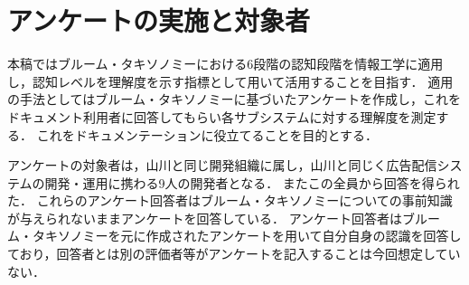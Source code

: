 \section{アンケートの実施と対象者}
本稿ではブルーム・タキソノミーにおける6段階の認知段階を情報工学に適用し，認知レベルを理解度を示す指標として用いて活用することを目指す．
適用の手法としてはブルーム・タキソノミーに基づいたアンケートを作成し，これをドキュメント利用者に回答してもらい各サブシステムに対する理解度を測定する．
これをドキュメンテーションに役立てることを目的とする．

アンケートの対象者は，山川と同じ開発組織に属し，山川と同じく広告配信システムの開発・運用に携わる9人の開発者となる．
またこの全員から回答を得られた．
これらのアンケート回答者はブルーム・タキソノミーについての事前知識が与えられないままアンケートを回答している．
アンケート回答者はブルーム・タキソノミーを元に作成されたアンケートを用いて自分自身の認識を回答しており，回答者とは別の評価者等がアンケートを記入することは今回想定していない．
